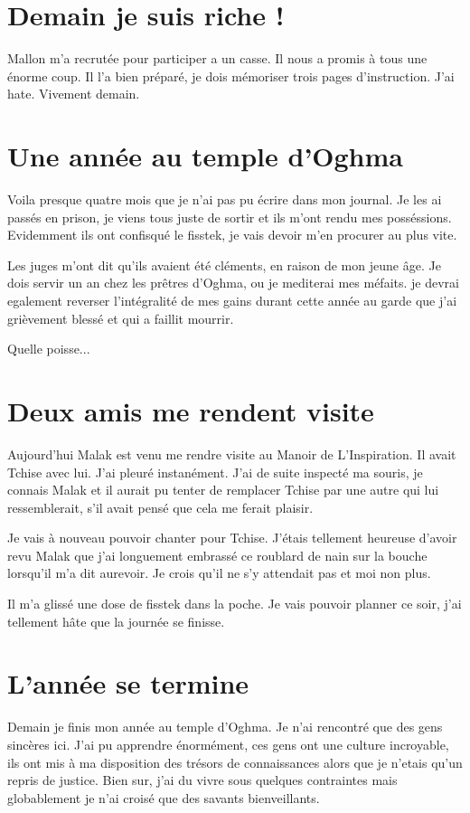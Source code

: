 \documentclass[10pt,a4paper,twoside,twocolumn,openany]{book}
\begin{document}
\section{Demain je suis riche !}

Mallon m'a recrutée pour participer a un casse. Il nous a promis à tous une énorme coup. Il l'a bien 
préparé, je dois mémoriser trois pages d'instruction. J'ai hate. Vivement demain.

\section{Une année au temple d'Oghma}

Voila presque quatre mois que je n'ai pas pu écrire dans mon journal. Je les ai
passés en prison, je viens tous juste de sortir et ils m'ont rendu mes posséssions.
Evidemment ils ont confisqué le fisstek, je vais devoir m'en procurer au plus vite.
 
Les juges m'ont dit qu'ils avaient été cléments, en raison de mon jeune âge. Je dois servir un an
chez les prêtres d'Oghma, ou je mediterai mes méfaits. je devrai egalement reverser l'intégralité 
de mes gains durant cette année au garde que j'ai grièvement blessé et qui a faillit mourrir.

Quelle poisse...

\section{Deux amis me rendent visite}

Aujourd'hui Malak est venu me rendre visite au Manoir de L'Inspiration.
Il avait Tchise avec lui. J'ai pleuré instanément.
J'ai de suite inspecté ma souris, je connais Malak et il aurait pu tenter de remplacer Tchise par une autre
qui lui ressemblerait, s'il avait pensé que cela me ferait plaisir. 

Je vais à nouveau pouvoir chanter pour Tchise. J'étais tellement heureuse d'avoir revu
Malak que j'ai longuement embrassé ce roublard de nain sur la bouche lorsqu'il m'a dit aurevoir. Je crois qu'il ne s'y 
attendait pas et moi non plus.

Il m'a glissé une dose de fisstek dans la poche. Je vais pouvoir planner ce soir, j'ai tellement hâte que la journée 
se finisse.

\section{L'année se termine}
Demain je finis mon année au temple d'Oghma. Je n'ai rencontré que des gens sincères ici.
J'ai pu apprendre énormément, ces gens ont une culture incroyable, ils ont mis à ma 
disposition des trésors de connaissances alors que je n'etais qu'un repris de justice.
Bien sur, j'ai du vivre sous quelques contraintes mais globablement je n'ai croisé
que des savants bienveillants.
\end{document}
